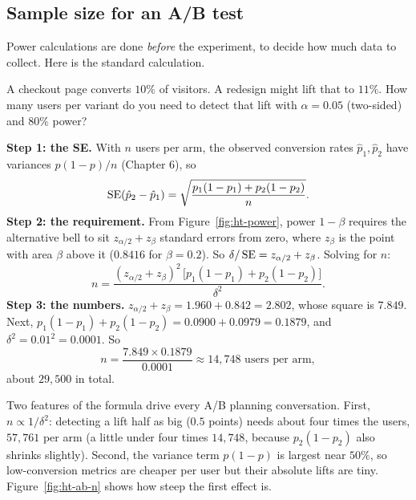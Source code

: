 \subsection{Sample size for an A/B test}

Power calculations are done \emph{before} the experiment, to decide how much data to
collect. Here is the standard calculation.

\begin{example}
A checkout page converts $10\%$ of visitors. A redesign might lift that to $11\%$.
How many users per variant do you need to detect that lift with $\alpha=0.05$
(two-sided) and $80\%$ power?

\textbf{Step 1: the SE.} With $n$ users per arm, the observed conversion rates
$\hat p_1,\hat p_2$ have variances $p(1-p)/n$ (Chapter 6), so
\[
  \operatorname{SE}(\hat p_2-\hat p_1) = \sqrt{\frac{p_1(1-p_1) + p_2(1-p_2)}{n}} .
\]
\textbf{Step 2: the requirement.} From Figure~\ref{fig:ht-power}, power $1-\beta$
requires the alternative bell to sit $z_{\alpha/2} + z_\beta$ standard errors from
zero, where $z_\beta$ is the point with area $\beta$ above it ($0.8416$ for
$\beta=0.2$). So $\delta/\operatorname{SE} = z_{\alpha/2}+z_\beta$. Solving for $n$:
\[
  n = \frac{(z_{\alpha/2} + z_\beta)^2\,\bigl[p_1(1-p_1)+p_2(1-p_2)\bigr]}{\delta^2}.
\]
\textbf{Step 3: the numbers.} $z_{\alpha/2}+z_\beta = 1.960+0.842 = 2.802$, whose
square is $7.849$. Next, $p_1(1-p_1)+p_2(1-p_2) = 0.0900 + 0.0979 = 0.1879$, and
$\delta^2 = 0.01^2 = 0.0001$. So
\[
  n = \frac{7.849 \times 0.1879}{0.0001} \approx 14{,}748 \text{ users per arm},
\]
about $29{,}500$ in total.
\end{example}

Two features of the formula drive every A/B planning conversation. First,
$n\propto 1/\delta^2$: detecting a lift half as big ($0.5$ points) needs about four
times the users, $57{,}761$ per arm (a little under four times $14{,}748$, because
$p_2(1-p_2)$ also shrinks slightly). Second, the variance term $p(1-p)$ is largest
near $50\%$, so low-conversion metrics are cheaper per user but their absolute lifts
are tiny. Figure~\ref{fig:ht-ab-n} shows how steep the first effect is.

